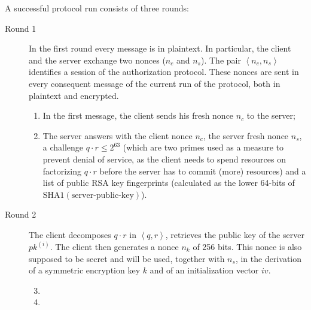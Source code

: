 A successful protocol run consists of three rounds:
\begin{description}
    \item[Round 1] In the first round every message is in plaintext. In particular, the client and the server exchange two nonces ($n_c$ and $n_s$). The pair $\left<n_c, n_s\right>$ identifies a session of the authorization protocol. These nonces are sent in every consequent message of the current run of the protocol, both in plaintext and encrypted.
    \begin{enumerate}
        \item{In the first message, the client sends his fresh nonce $n_c$ to the server;}
        \item{The server answers with the client nonce $n_c$, the server fresh nonce $n_s$, a challenge $q \cdot r \leq 2^{63}$ (which are two primes used as a measure to prevent denial of service, as the client needs to spend resources on factorizing $q \cdot r$ before the server has to commit (more) resources) and a list of public RSA key fingerprints (calculated as the lower 64-bits of $\mbox{SHA1}\left(\mbox{server-public-key}\right)$).}
    \end{enumerate}

    \item[Round 2] The client decomposes $q\cdot r$ in $\left<q, r\right>$, retrieves the public key of the server $pk^{\left(i\right)}$. The client then generates a nonce $n_k$ of 256 bits. This nonce is also supposed to be secret and will be used, together with $n_s$, in the derivation of a symmetric encryption key $k$ and of an initialization vector $iv$.
    \begin{enumerate}
        \setcounter{enumi}{2}
        \item{}
        \item{}
    \end{enumerate}

\end{description}

